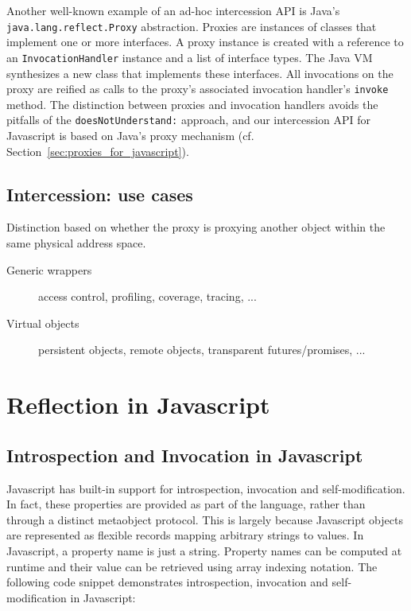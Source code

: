 \documentclass{acm_proc_article-sp}
\begin{document}
Another well-known example of an ad-hoc intercession API is Java's \texttt{java.lang.reflect.Proxy} abstraction. Proxies are instances of classes that implement one or more interfaces. A proxy instance is created with a reference to an \texttt{InvocationHandler} instance and a list of interface types. The Java VM synthesizes a new class that implements these interfaces. All invocations on the proxy are reified as calls to the proxy's associated invocation handler's \texttt{invoke} method. The distinction between proxies and invocation handlers avoids the pitfalls of the \texttt{doesNotUnderstand:} approach, and our intercession API for Javascript is based on Java's proxy mechanism (cf. Section~\ref{sec:proxies_for_javascript}).

\subsection{Intercession: use cases}
\label{sub:use_cases}

Distinction based on whether the proxy is proxying another object within the same physical address space.

\begin{description}
  \item[Generic wrappers] access control, profiling, coverage, tracing, ...
  \item[Virtual objects] persistent objects, remote objects, transparent futures/promises, ...
\end{description}

\section{Reflection in Javascript}

\subsection{Introspection and Invocation in Javascript}
\label{sub:introspection_in_js}

Javascript has built-in support for introspection, invocation and self-modification. In fact, these properties are provided as part of the language, rather than through a distinct metaobject protocol. This is largely because Javascript objects are represented as flexible records mapping arbitrary strings to values. In Javascript, a property name is just a string. Property names can be computed at runtime and their value can be retrieved using array indexing notation. The following code snippet demonstrates introspection, invocation and self-modification in Javascript:
\end{document}
